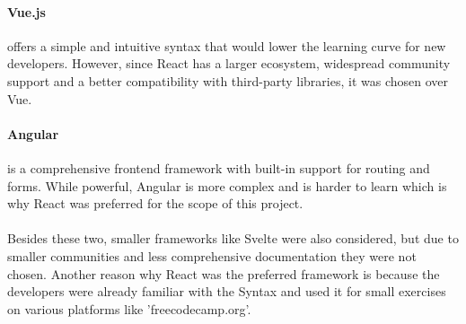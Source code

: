 \documentclass[a4paper,12pt]{report}
\begin{document}
\paragraph{Vue.js} offers a simple and intuitive syntax that would lower the learning curve for new developers. However, since React has a larger ecosystem, widespread community support and a better compatibility with third-party libraries, it was chosen over Vue. \cite{react-docs} \cite{vue-docs}
\paragraph{Angular} is a comprehensive frontend framework with built-in support for routing and forms. While powerful, Angular is more complex and is harder to learn which is why React was preferred for the scope of this project. \cite{angular-docs} \\ \\
Besides these two, smaller frameworks like Svelte were also considered, but due to smaller communities and less comprehensive documentation they were not chosen. Another reason why React was the preferred framework is because the developers were already familiar with the Syntax and used it for small exercises on various platforms like 'freecodecamp.org'. \\
\end{document}
